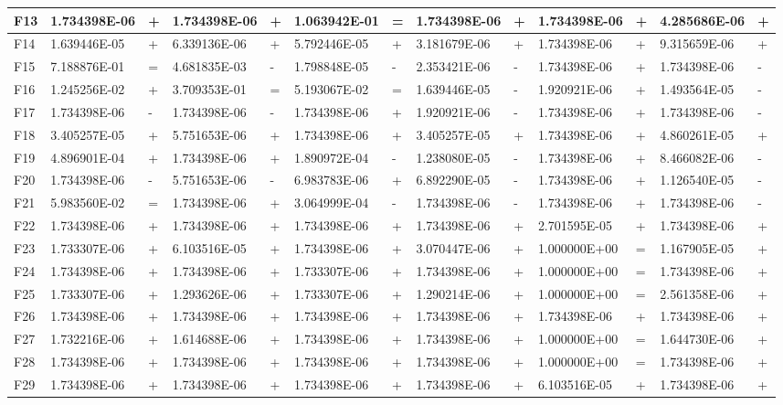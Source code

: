 \documentclass{article} %
\begin{document}
\begin{tabular}{|p{0.3in}|p{0.6in}|p{0.2in}|p{0.6in}|p{0.2in}|p{0.6in}|p{0.2in}|p{0.6in}|p{0.2in}|p{0.6in}|p{0.2in}|p{0.6in}|p{0.2in}|}
F13 & 1.734398E-06 & + & 1.734398E-06 & + & 1.063942E-01 & = & 1.734398E-06 & + & 1.734398E-06 & + & 4.285686E-06 & + \\ \hline 
F14 & 1.639446E-05 & + & 6.339136E-06 & + & 5.792446E-05 & + & 3.181679E-06 & + & 1.734398E-06 & + & 9.315659E-06 & + \\ \hline 
F15 & 7.188876E-01 & = & 4.681835E-03 & - & 1.798848E-05 & - & 2.353421E-06 & - & 1.734398E-06 & + & 1.734398E-06 & - \\ \hline 
F16 & 1.245256E-02 & + & 3.709353E-01 & = & 5.193067E-02 & = & 1.639446E-05 & - & 1.920921E-06 & + & 1.493564E-05 & - \\ \hline 
F17 & 1.734398E-06 & - & 1.734398E-06 & - & 1.734398E-06 & + & 1.920921E-06 & - & 1.734398E-06 & + & 1.734398E-06 & - \\ \hline 
F18 & 3.405257E-05 & + & 5.751653E-06 & + & 1.734398E-06 & + & 3.405257E-05 & + & 1.734398E-06 & + & 4.860261E-05 & + \\ \hline 
F19 & 4.896901E-04 & + & 1.734398E-06 & + & 1.890972E-04 & - & 1.238080E-05 & - & 1.734398E-06 & + & 8.466082E-06 & - \\ \hline 
F20 & 1.734398E-06 & - & 5.751653E-06 & - & 6.983783E-06 & + & 6.892290E-05 & - & 1.734398E-06 & + & 1.126540E-05 & - \\ \hline 
F21 & 5.983560E-02 & = & 1.734398E-06 & + & 3.064999E-04 & - & 1.734398E-06 & - & 1.734398E-06 & + & 1.734398E-06 & - \\ \hline 
F22 & 1.734398E-06 & + & 1.734398E-06 & + & 1.734398E-06 & + & 1.734398E-06 & + & 2.701595E-05 & + & 1.734398E-06 & + \\ \hline 
F23 & 1.733307E-06 & + & 6.103516E-05 & + & 1.734398E-06 & + & 3.070447E-06 & + & 1.000000E+00 & = & 1.167905E-05 & + \\ \hline 
F24 & 1.734398E-06 & + & 1.734398E-06 & + & 1.733307E-06 & + & 1.734398E-06 & + & 1.000000E+00 & = & 1.734398E-06 & + \\ \hline 
F25 & 1.733307E-06 & + & 1.293626E-06 & + & 1.733307E-06 & + & 1.290214E-06 & + & 1.000000E+00 & = & 2.561358E-06 & + \\ \hline 
F26 & 1.734398E-06 & + & 1.734398E-06 & + & 1.734398E-06 & + & 1.734398E-06 & + & 1.734398E-06 & + & 1.734398E-06 & + \\ \hline 
F27 & 1.732216E-06 & + & 1.614688E-06 & + & 1.734398E-06 & + & 1.734398E-06 & + & 1.000000E+00 & = & 1.644730E-06 & + \\ \hline 
F28 & 1.734398E-06 & + & 1.734398E-06 & + & 1.734398E-06 & + & 1.734398E-06 & + & 1.000000E+00 & = & 1.734398E-06 & + \\ \hline 
F29 & 1.734398E-06 & + & 1.734398E-06 & + & 1.734398E-06 & + & 1.734398E-06 & + & 6.103516E-05 & + & 1.734398E-06 & + \\ \hline 
\end{tabular}
\end{document}
